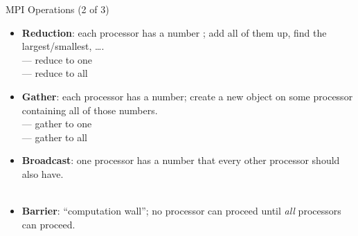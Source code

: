 \begin{frame}[shrink]
  \begin{block}{MPI Operations (2 of 3)}\pause
    \begin{itemize}
      \item \textbf{Reduction}:  each processor has a number ; add all of them up, find the largest/smallest, \dots .\\
       --- reduce to one\\
       --- reduce to all\\[.4cm]
      \item \textbf{Gather}: each processor has a number; create a new object on some processor containing all of those numbers.\\
       --- gather to one\\
       --- gather to all\\[.4cm]
      \item \textbf{Broadcast}: one processor has a number  that every other processor should also have.\\
      \\[.4cm]
      \item \textbf{Barrier}: ``computation wall''; no processor can proceed until \emph{all} processors can proceed.\\
    \end{itemize}
  \end{block}
\end{frame}





